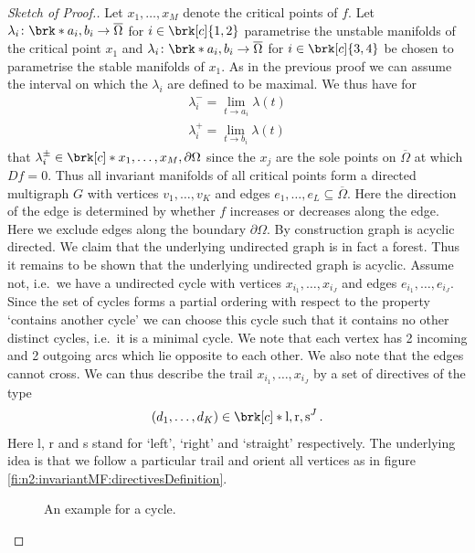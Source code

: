 \begin{proof}[Sketch of Proof.]
  Let $x_1,\dots,x_M$ denote the critical points of $f$. Let $\lambda_i\colon\brk*{a_i,b_i}\to\overline{\Omega}$ for $i\in\brk[c]{1,2}$ parametrise the unstable manifolds of the
  critical point $x_1$ and
  $\lambda_i\colon\brk*{a_i,b_i}\to\overline{\Omega}$ for $i\in\brk[c]{3,4}$ be chosen to parametrise the stable manifolds of $x_1$.
  As in the previous proof we can assume the interval on which the $\lambda_i$ are defined to be maximal. We thus have for
  \begin{align*}
    \lambda_i^-=\lim_{t\to a_i}\lambda(t) \\
    \lambda_i^+=\lim_{t\to b_i}\lambda(t)
  \end{align*}
  that $\lambda_i^\pm\in\brk[c]*{x_1,\dots,x_M,\partial\Omega}$ since the $x_j$ are the sole points on $\overline{\Omega}$
  at which $Df=0$. Thus all invariant manifolds of all critical points form a directed multigraph $G$ with vertices $v_1,\dots,v_K$ and 
  edges $e_1,\dots,e_L\subseteq\overline{\Omega}$. Here the direction of the edge is determined by whether $f$ increases or decreases
  along the edge. Here we exclude edges along the boundary $\partial\Omega$.
  By construction graph is acyclic directed. We claim that the underlying undirected graph is in fact a forest. Thus it remains to
  be shown that the underlying undirected graph is acyclic.
  Assume not, i.e.\ we have a undirected cycle with vertices $x_{i_1},\dots,x_{i_J}$ and edges $e_{i_1},\dots,e_{i_J}$.
  Since the set of cycles forms a partial ordering with respect to the property `contains another cycle' we can choose this cycle such
  that it contains no other distinct cycles, i.e.\ it is a minimal cycle.
  We note that each vertex has 2 incoming and 2 outgoing arcs which lie opposite to each other.
  We also note that the edges cannot cross. 
  We can thus describe the trail $x_{i_1},\dots,x_{i_J}$ by a set of directives of the type
  \begin{align*}
    (d_1,\dots,d_K) \in \brk[c]*{\text{l},\text{r},\text{s}}^J\,.
  \end{align*}
  Here l, r and s stand for `left', `right' and `straight' respectively.
  The underlying idea is that we follow a particular trail and orient all vertices as in figure \ref{fi:n2:invariantMF:directivesDefinition}.
  
  \begin{figure}
    \centering
    \begin{minipage}{0.4\textwidth}
      \def\svgwidth{0.7\textwidth}
      
      \caption{Explanation of the directives `l',`r' and `r'.}
      \label{fi:n2:invariantMF:directivesDefinition}
    \end{minipage}
    \hfill
    \begin{minipage}{0.4\textwidth}
      \def\svgwidth{1\textwidth}
      
      \caption{An example for a cycle.}
      \label{fi:n2:invariantMF:directivesExample}
    \end{minipage}
  \end{figure}


\end{proof}
